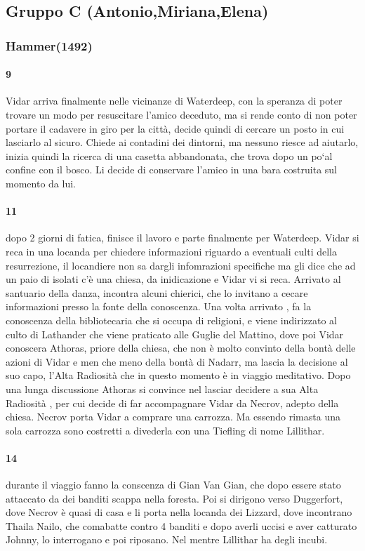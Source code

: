 \documentclass{article}
\begin{document}
\subsection{Gruppo C (Antonio,Miriana,Elena)}
\subsubsection{Hammer(1492)}
      \paragraph{9} Vidar arriva finalmente nelle vicinanze di Waterdeep, con la speranza di poter trovare un modo per resuscitare l'amico deceduto, ma si rende conto di non poter portare il cadavere in giro per la città, decide quindi di cercare un posto in cui lasciarlo al sicuro. Chiede ai contadini dei dintorni, ma nessuno riesce ad aiutarlo, inizia quindi la ricerca di una casetta abbandonata, che trova dopo un po`al confine con il bosco. Li decide di conservare l'amico in una bara costruita sul momento da lui. 
      \paragraph{11} dopo 2 giorni di fatica, finisce il lavoro e parte finalmente per Waterdeep. Vidar si reca in una locanda per chiedere informazioni riguardo a eventuali culti della resurrezione, il locandiere non sa dargli infomrazioni specifiche ma gli dice che ad un paio di isolati c'è una chiesa, da inidicazione e Vidar vi si reca. Arrivato al santuario della danza, incontra alcuni chierici, che lo invitano a cecare informazioni presso la fonte della conoscenza. Una volta arrivato , fa la conoscenza della bibliotecaria che si occupa di religioni, e viene indirizzato al culto di Lathander che viene praticato alle Guglie del Mattino, dove poi Vidar conoscera Athoras, priore della chiesa, che non è molto convinto della bontà delle azioni di Vidar e men che meno della bontà di Nadarr, ma lascia la decisione al suo capo, l'Alta Radiosità che in questo momento è in viaggio meditativo. Dopo una lunga discussione Athoras si convince nel lasciar decidere a sua Alta Radiosità , per cui decide di far accompagnare Vidar da Necrov, adepto della chiesa. Necrov porta Vidar a comprare una carrozza. Ma essendo rimasta una sola carrozza sono costretti a divederla con una Tiefling di nome Lillithar. 
      \paragraph{14} durante il viaggio fanno la conscenza di Gian Van Gian, che dopo essere stato attaccato da dei banditi scappa nella foresta. Poi si dirigono verso Duggerfort, dove Necrov è quasi di casa e li porta nella locanda dei Lizzard, dove incontrano Thaila Nailo, che comabatte contro 4 banditi e dopo averli uccisi e aver catturato Johnny, lo interrogano e poi riposano. Nel mentre Lillithar ha degli incubi. 
\end{document}
